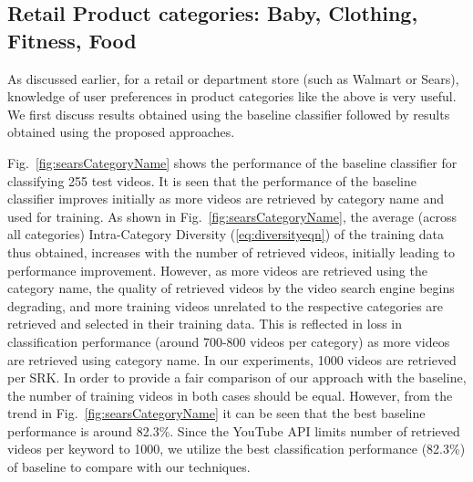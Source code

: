\subsection{Retail Product categories: Baby, Clothing, Fitness, Food }
     As discussed earlier, for a retail or department store (such as Walmart or Sears), knowledge of user preferences in product categories like the above is very useful. We first discuss results obtained using the baseline classifier followed by results obtained using the proposed approaches. 

Fig.~\ref{fig:searsCategoryName} shows the performance of the baseline classifier for classifying 255 test videos. It is seen that the performance of the baseline classifier improves initially as more videos are retrieved by category name and used for training. As shown in Fig.~\ref{fig:searsCategoryName}, the average (across all categories) Intra-Category Diversity (\ref{eq:diversityeqn}) of the training data thus obtained, increases with the number of retrieved videos, initially leading to performance improvement. However, as more videos are retrieved using the category name, the quality of retrieved videos by the video search engine begins degrading, and more training videos unrelated to the respective categories are retrieved and selected in their training data. This is reflected in loss in classification performance (around 700-800 videos per category) as more videos are retrieved using category name. In our experiments, 1000 videos are retrieved per SRK. In order to provide a fair comparison of our approach with the baseline, the number of training videos in both cases should be equal. However, from the trend in Fig.~\ref{fig:searsCategoryName} it can be seen that the best baseline performance is around 82.3\%. Since the YouTube API limits number of retrieved videos per keyword to 1000, we utilize the best classification performance (82.3\%) of baseline to compare with our techniques.  

